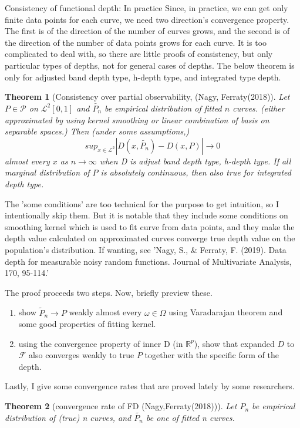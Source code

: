 \documentclass[aspectratio=169,ignorenonframetext,9pt]{beamer}
\theoremstyle{plain}
\newtheorem{thm}{Theorem}[section]
\theoremstyle{definition}
\begin{document}
\begin{frame}{Consistency of functional depth: In practice}
Since, in practice, we can get only finite data points for each curve, we need two direction's convergence property. 
The first is of the direction of the number of curves grows, and the second is of the direction of the number of data points grows for each curve.
It is too complicated to deal with, so there are little proofs of consistency, but only particular types of depths, not for general cases of depths.
The below theorem is only for adjusted band depth type, h-depth type, and integrated type depth.

\begin{thm}[Consistency over partial observability, (Nagy, Ferraty(2018)]
    Let $P\in\mathcal{P}$ on $\mathcal{L}^2[0,1]$ and $\tilde{P_n}$ be empirical distribution of fitted $n$ curves.
    (either approximated by using kernel smoothing or linear combination of basis on separable spaces.)
    Then (under some assumptions,)
    \[sup_{x\in\mathcal{L}^2} |D(x,\tilde{P_n})-D(x,P)|\rightarrow 0\]
    almost every $x$ as $n\rightarrow\infty$ when D is adjust band depth type, h-depth type.
    If all marginal distribution of $P$ is absolutely continuous, then also true for integrated depth type.
\end{thm}

The 'some conditions' are too technical for the purpose to get intuition, so I intentionally skip them.
But it is notable that they include some conditions on smoothing kernel which is used to fit curve from data points,
and they make the depth value calculated on approximated curves converge true depth value on the population's distribution.
If wanting, see 'Nagy, S., \& Ferraty, F. (2019). Data depth for measurable noisy random functions. Journal of Multivariate Analysis, 170, 95-114.'

The proof proceeds two steps. Now, briefly preview these.
\begin{enumerate}
    \item show $\tilde{P}_n\rightarrow P$ weakly almost every $\omega\in\Omega$ using Varadarajan theorem and some good properties of fitting kernel.
    \item using the convergence property of inner D (in $\mathbb{R}^p$),
    show that expanded $D$ to $\mathcal{F}$ also converges weakly to true $P$ together with the specific form of the depth.
\end{enumerate}

Lastly, I give some convergence rates that are proved lately by some researchers.
\begin{thm}[convergence rate of FD (Nagy,Ferraty(2018))]
    Let $P_n$ be empirical distribution of (true) n curves, and $\tilde{P_n}$ be one of fitted n curves.


\end{thm}
\end{frame}
\end{document}
